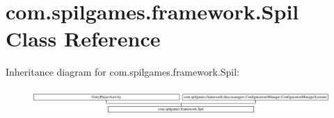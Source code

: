 \hypertarget{classcom_1_1spilgames_1_1framework_1_1_spil}{\section{com.\-spilgames.\-framework.\-Spil Class Reference}
\label{classcom_1_1spilgames_1_1framework_1_1_spil}
}
Inheritance diagram for com.\-spilgames.\-framework.\-Spil\-:\begin{figure}[H]
\begin{center}
\leavevmode
\includegraphics[height=0.991150cm]{classcom_1_1spilgames_1_1framework_1_1_spil}
\end{center}
\end{figure}
